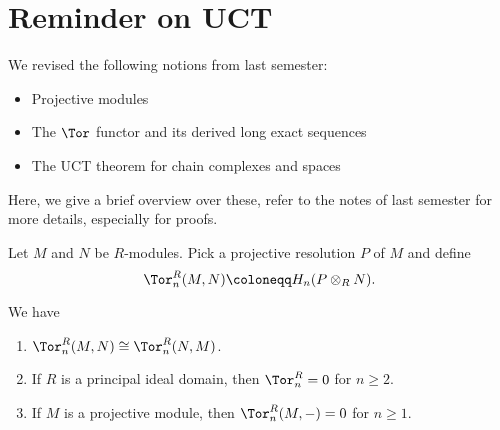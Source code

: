
\section{Reminder on UCT}

\begin{editor}
  We revised the following notions from last semester:
  \begin{itemize}
    \item Projective modules
    \item The $\Tor$ functor and its derived long exact sequences
    \item The UCT theorem for chain complexes and spaces
  \end{itemize}

  Here, we give a brief overview over these, refer to the notes of last
  semester for more details, especially for proofs.
\end{editor}

\begin{definition}
  Let $M$ and  $N$ be  $R$-modules.
  Pick a projective resolution $P$ of $M$ and define
  \[
  \Tor_n^R(M,N) \coloneqq  H_n ( P \otimes _R N )
  .\] 
\end{definition}

\begin{lemma}
  We have
  \begin{enumerate}[h]
    \item $\Tor_n^R(M,N) \cong \Tor_n^R (N,M)$.
    \item  If  $R$ is a principal ideal domain,
      then $\Tor_n^R = 0$ for $n\geq 2$.
    \item If $M$ is a projective module,
      then  $\Tor_n^R(M, \dash) = 0$ for $n\geq 1$.
  \end{enumerate}
\end{lemma}

